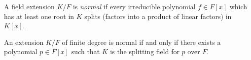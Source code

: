\documentclass[12pt]{article}
\begin{document}
A field extension $K/F$ is \emph{normal} if every irreducible polynomial $f \in F[x]$ which has at least one root in $K$ splits (factors into a product of linear factors) in $K[x]$.

An extension $K/F$ of finite degree is normal if and only if there exists a polynomial $p \in F[x]$ such that $K$ is the splitting field for $p$ over $F$.
\end{document}
